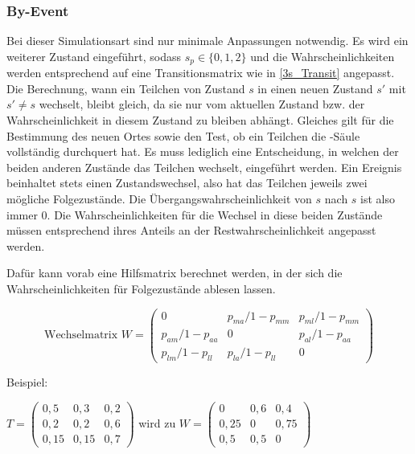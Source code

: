 \subsubsection{By-Event}
Bei dieser Simulationsart sind nur minimale Anpassungen notwendig. Es wird ein weiterer Zustand eingeführt, sodass $s_p \in \{0,1,2\}$ und die Wahrscheinlichkeiten werden entsprechend auf eine Transitionsmatrix wie in \ref{3s_Transit} angepasst.
Die Berechnung, wann ein Teilchen von Zustand $s$ in einen neuen Zustand $s'$ mit $s' \neq s$ wechselt, bleibt gleich, da sie nur vom aktuellen Zustand bzw. der Wahrscheinlichkeit in diesem Zustand zu bleiben abhängt. Gleiches gilt für die Bestimmung des neuen Ortes sowie den Test, ob ein Teilchen die -Säule vollständig durchquert hat. Es muss lediglich eine Entscheidung, in welchen der beiden anderen Zustände das Teilchen wechselt, eingeführt werden. Ein Ereignis beinhaltet stets einen Zustandswechsel, also hat das Teilchen jeweils zwei mögliche Folgezustände. Die Übergangswahrscheinlichkeit von $s$ nach $s$ ist also immer $0$. Die Wahrscheinlichkeiten für die Wechsel in diese beiden Zustände müssen entsprechend ihres Anteils an der Restwahrscheinlichkeit angepasst werden.

Dafür kann vorab eine Hilfsmatrix berechnet werden, in der sich die Wahrscheinlichkeiten für Folgezustände ablesen lassen.

\begin{equation}
\text{Wechselmatrix } W = 
\begin{pmatrix}
0 &  p_{ma}/1-p_{mm} & p_{ml}/1-p_{mm} \\
p_{am}/1- p_{aa} & 0 & p_{al}/1- p_{aa} \\
p_{lm}/1-p_{ll} &  p_{la}/1-p_{ll} & 0 
\end{pmatrix}  
\end{equation}

Beispiel:

$T= 
\begin{pmatrix}
0,5 & 0,3 & 0,2 \\
0,2 & 0,2 & 0,6 \\
0,15 & 0,15 & 0,7 
\end{pmatrix}
$  wird zu 
$W= 
\begin{pmatrix}
0 & 0,6 & 0,4 \\
0,25 & 0 & 0,75 \\
0,5 & 0,5 & 0 
\end{pmatrix}
$  


